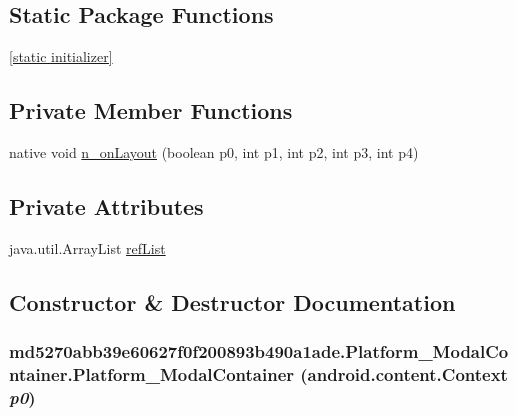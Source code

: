 \subsection*{Static Package Functions}
\begin{CompactItemize}
\item 
\hyperlink{classmd5270abb39e60627f0f200893b490a1ade_1_1_platform___modal_container_8fe255f1a4a5b8705ac7e51460d0820f}{\mbox{[}static initializer\mbox{]}}
\end{CompactItemize}
\subsection*{Private Member Functions}
\begin{CompactItemize}
\item 
native void \hyperlink{classmd5270abb39e60627f0f200893b490a1ade_1_1_platform___modal_container_b786bb28e11cf2bfaeaeaaa0f9eb34cf}{n\_\-onLayout} (boolean p0, int p1, int p2, int p3, int p4)
\end{CompactItemize}
\subsection*{Private Attributes}
\begin{CompactItemize}
\item 
java.util.ArrayList \hyperlink{classmd5270abb39e60627f0f200893b490a1ade_1_1_platform___modal_container_34509ff100ef69e7caefbb3d40346429}{refList}
\end{CompactItemize}


\subsection{Constructor \& Destructor Documentation}
\hypertarget{classmd5270abb39e60627f0f200893b490a1ade_1_1_platform___modal_container_92a10110c5163250038b70eac72edf9c}{
\subsubsection[{Platform\_\-ModalContainer}]{\setlength{\rightskip}{0pt plus 5cm}md5270abb39e60627f0f200893b490a1ade.Platform\_\-ModalContainer.Platform\_\-ModalContainer (android.content.Context {\em p0})}}
\label{classmd5270abb39e60627f0f200893b490a1ade_1_1_platform___modal_container_92a10110c5163250038b70eac72edf9c}


